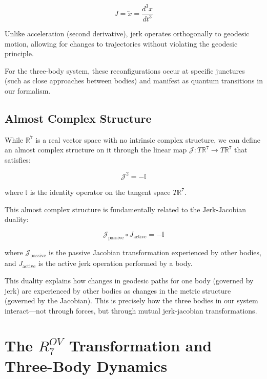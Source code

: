\documentclass{article}
\begin{document}
\begin{equation}
J = \dddot{x} = \frac{d^3x}{dt^3}
\end{equation}

Unlike acceleration (second derivative), jerk operates orthogonally to geodesic motion, allowing for changes to trajectories without violating the geodesic principle.

For the three-body system, these reconfigurations occur at specific junctures (such as close approaches between bodies) and manifest as quantum transitions in our formalism.

\subsection{Almost Complex Structure}

While $\mathbb{R}^7$ is a real vector space with no intrinsic complex structure, we can define an almost complex structure on it through the linear map $\mathcal{J}: T\mathbb{R}^7 \rightarrow T\mathbb{R}^7$ that satisfies:

\begin{equation}
\mathcal{J}^2 = -\mathbb{I}
\end{equation}

where $\mathbb{I}$ is the identity operator on the tangent space $T\mathbb{R}^7$.

This almost complex structure is fundamentally related to the Jerk-Jacobian duality:

\begin{equation}
\mathcal{J}_{\text{passive}} \circ J_{\text{active}} = -\mathbb{I}
\end{equation}

where $\mathcal{J}_{\text{passive}}$ is the passive Jacobian transformation experienced by other bodies, and $J_{\text{active}}$ is the active jerk operation performed by a body.

This duality explains how changes in geodesic paths for one body (governed by jerk) are experienced by other bodies as changes in the metric structure (governed by the Jacobian). This is precisely how the three bodies in our system interact—not through forces, but through mutual jerk-jacobian transformations.

\section{The $R^{OV}_7$ Transformation and Three-Body Dynamics}
\end{document}
